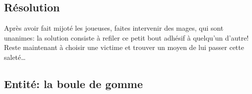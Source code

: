 \subsection{Résolution}

Après avoir fait mijoté les joueuses, faites intervenir des mages, qui sont unanimes: la solution consiste à refiler ce petit bout adhésif à quelqu'un d'autre!
Reste maintenant à choisir une victime et trouver un moyen de lui passer cette saleté\dots

\subsection{Entité: la boule de gomme}

